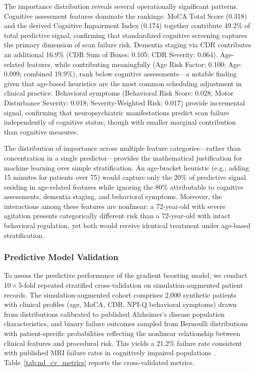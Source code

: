 \documentclass[11pt,a4paper]{article}
\begin{document}
The importance distribution reveals several operationally significant patterns. Cognitive assessment features dominate the rankings: MoCA Total Score (0.318) and the derived Cognitive Impairment Index (0.174) together contribute 49.2\% of total predictive signal, confirming that standardized cognitive screening captures the primary dimension of scan failure risk. Dementia staging via CDR contributes an additional 16.9\% (CDR Sum of Boxes: 0.105; CDR Severity: 0.064). Age-related features, while contributing meaningfully (Age Risk Factor: 0.100; Age: 0.099; combined 19.9\%), rank below cognitive assessments---a notable finding given that age-based heuristics are the most common scheduling adjustment in clinical practice. Behavioral symptoms (Behavioral Risk Score: 0.028; Motor Disturbance Severity: 0.018; Severity-Weighted Risk: 0.017) provide incremental signal, confirming that neuropsychiatric manifestations predict scan failure independently of cognitive status, though with smaller marginal contribution than cognitive measures.

The distribution of importance across multiple feature categories---rather than concentration in a single predictor---provides the mathematical justification for machine learning over simple stratification. An age-bracket heuristic (e.g., adding 15 minutes for patients over 75) would capture only the 20\% of predictive signal residing in age-related features while ignoring the 80\% attributable to cognitive assessments, dementia staging, and behavioral symptoms. Moreover, the interactions among these features are nonlinear: a 72-year-old with severe agitation presents categorically different risk than a 72-year-old with intact behavioral regulation, yet both would receive identical treatment under age-based stratification.

\subsubsection{Predictive Model Validation}

To assess the predictive performance of the gradient boosting model, we conduct $10 \times 5$-fold repeated stratified cross-validation on simulation-augmented patient records. The simulation-augmented cohort comprises 2,000 synthetic patients with clinical profiles (age, MoCA, CDR, NPI-Q behavioral symptoms) drawn from distributions calibrated to published Alzheimer's disease population characteristics, and binary failure outcomes sampled from Bernoulli distributions with patient-specific probabilities reflecting the nonlinear relationship between clinical features and procedural risk. This yields a 21.2\% failure rate consistent with published MRI failure rates in cognitively impaired populations \citep{porembka2025disparities}. Table~\ref{tab:ml_cv_metrics} reports the cross-validated metrics.
\end{document}
